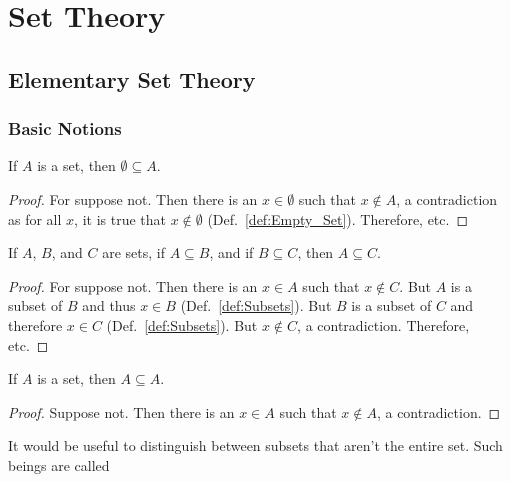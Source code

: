 \chapter{Set Theory}
    \section{Elementary Set Theory}
        \subsection{Basic Notions}
            \begin{theorem}
                \label{thm:Emptyset_Is_Subset}%
                If $A$ is a set, then $\emptyset\subseteq{A}$.
            \end{theorem}
            \begin{proof}
                For suppose not. Then there is an $x\in\emptyset$
                such that $x\notin{A}$, a contradiction as
                for all $x$, it is true that $x\notin\emptyset$
                (Def.~\ref{def:Empty_Set}). Therefore, etc.
            \end{proof}
            \begin{theorem}
                \label{thm:Subset_is_Transitive}%
                If $A$, $B$, and $C$ are sets, if
                $A\subseteq{B}$, and if $B\subseteq{C}$, then
                $A\subseteq{C}$.
            \end{theorem}
            \begin{proof}
                For suppose not. Then there is an $x\in{A}$ such
                that $x\notin{C}$. But $A$ is a subset of $B$
                and thus $x\in{B}$ (Def.~\ref{def:Subsets}). But
                $B$ is a subset of $C$ and therefore $x\in{C}$
                (Def.~\ref{def:Subsets}). But $x\notin{C}$, a
                contradiction. Therefore, etc.
            \end{proof}
            \begin{theorem}
                \label{thm:Set_Is_Subset_Of_Self}%
                If $A$ is a set, then $A\subseteq{A}$.
            \end{theorem}
            \begin{proof}
                Suppose not. Then there is an $x\in{A}$
                such that $x\notin{A}$, a contradiction.
            \end{proof}
            It would be useful to distinguish between subsets
            that aren't the entire set. Such beings are called
